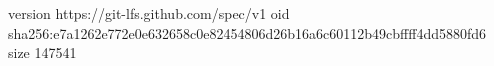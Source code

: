 version https://git-lfs.github.com/spec/v1
oid sha256:e7a1262e772e0e632658c0e82454806d26b16a6c60112b49cbffff4dd5880fd6
size 147541
